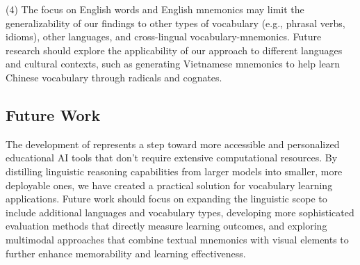 (4) The focus on English words and English mnemonics may limit the generalizability of our findings to other types of vocabulary (e.g., phrasal verbs, idioms), other languages, and cross-lingual vocabulary-mnemonics. Future research should explore the applicability of our approach to different languages and cultural contexts, such as generating Vietnamese mnemonics to help learn Chinese vocabulary through radicals and cognates.

\subsection{Future Work} \label{sec:future-work}

The development of \linksys represents a step toward more accessible and personalized educational AI tools that don't require extensive computational resources. By distilling linguistic reasoning capabilities from larger models into smaller, more deployable ones, we have created a practical solution for vocabulary learning applications. Future work should focus on expanding the linguistic scope to include additional languages and vocabulary types, developing more sophisticated evaluation methods that directly measure learning outcomes, and exploring multimodal approaches that combine textual mnemonics with visual elements to further enhance memorability and learning effectiveness.
